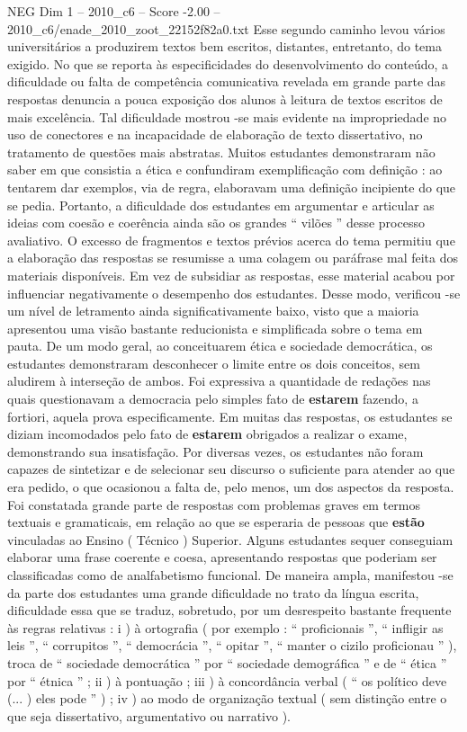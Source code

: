 \begin{textsample}{NEG Dim 1 – 2010\_c6 – Score -2.00 – 2010\_c6/enade\_2010\_zoot\_22152f82a0.txt}
Esse segundo caminho levou vários universitários a produzirem textos bem escritos, distantes, entretanto, do tema exigido.
No que se reporta às especificidades do desenvolvimento do conteúdo, a dificuldade ou falta de competência comunicativa revelada em grande parte das respostas denuncia a pouca exposição dos alunos à leitura de textos escritos de mais excelência.
Tal dificuldade mostrou -se mais evidente na impropriedade no uso de conectores e na incapacidade de elaboração de texto dissertativo, no tratamento de questões mais abstratas.
Muitos estudantes demonstraram não saber em que consistia a ética e confundiram exemplificação com definição : ao tentarem dar exemplos, via de regra, elaboravam uma definição incipiente do que se pedia.
Portanto, a dificuldade dos estudantes em argumentar e articular as ideias com coesão e coerência ainda são os grandes “ vilões ” desse processo avaliativo.
O excesso de fragmentos e textos prévios acerca do tema permitiu que a elaboração das respostas se resumisse a uma colagem ou paráfrase mal feita dos materiais disponíveis.
Em vez de subsidiar as respostas, esse material acabou por influenciar negativamente o desempenho dos estudantes.
Desse modo, verificou -se um nível de letramento ainda significativamente baixo, visto que a maioria apresentou uma visão bastante reducionista e simplificada sobre o tema em pauta.
De um modo geral, ao conceituarem ética e sociedade democrática, os estudantes demonstraram desconhecer o limite entre os dois conceitos, sem aludirem à interseção de ambos.
Foi expressiva a quantidade de redações nas quais questionavam a democracia pelo simples fato de \textbf{estarem} fazendo, a fortiori, aquela prova especificamente.
Em muitas das respostas, os estudantes se diziam incomodados pelo fato de \textbf{estarem} obrigados a realizar o exame, demonstrando sua insatisfação.
Por diversas vezes, os estudantes não foram capazes de sintetizar e de selecionar seu discurso o suficiente para atender ao que era pedido, o que ocasionou a falta de, pelo menos, um dos aspectos da resposta.
Foi constatada grande parte de respostas com problemas graves em termos textuais e gramaticais, em relação ao que se esperaria de pessoas que \textbf{estão} vinculadas ao Ensino ( Técnico ) Superior.
Alguns estudantes sequer conseguiam elaborar uma frase coerente e coesa, apresentando respostas que poderiam ser classificadas como de analfabetismo funcional.
De maneira ampla, manifestou -se da parte dos estudantes uma grande dificuldade no trato da língua escrita, dificuldade essa que se traduz, sobretudo, por um desrespeito bastante frequente às regras relativas : i ) à ortografia ( por exemplo : “ proficionais ”, “ infligir as leis ”, “ corrupitos ”, “ democrácia ”, “ opitar ”, “ manter o cizilo proficionau ” ), troca de “ sociedade democrática ” por “ sociedade demográfica ” e de “ ética ” por “ étnica ” ; ii ) à pontuação ; iii ) à concordância verbal ( “ os político deve (... ) eles pode ” ) ; iv ) ao modo de organização textual ( sem distinção entre o que seja dissertativo, argumentativo ou narrativo ).

\end{textsample}
